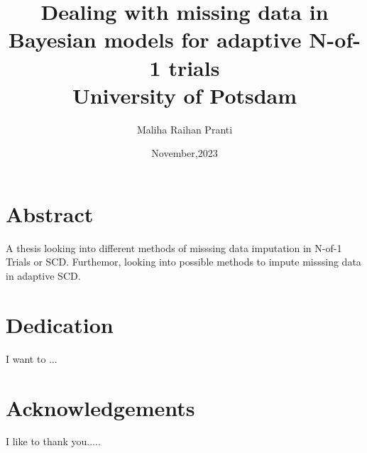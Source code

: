 \documentclass[a4paper, oneside]{book}
\title{Dealing with missing data in Bayesian models for adaptive N-of-1 trials\\
{\Large University of Potsdam}}
\author{Maliha Raihan Pranti}
\date{November,2023}
\begin{document}
\maketitle

\frontmatter %

\chapter*{Abstract}
A thesis looking into different methods of misssing data imputation in N-of-1 Trials or SCD. Furthemor, looking into possible methods to impute misssing data
in adaptive SCD.
\clearpage
\chapter*{Dedication}
I want to ...

\chapter*{Acknowledgements}
I like to thank you.....

\tableofcontents

\listoffigures
{}

\listoftables
{}

\mainmatter %











\appendix




\end{document}
